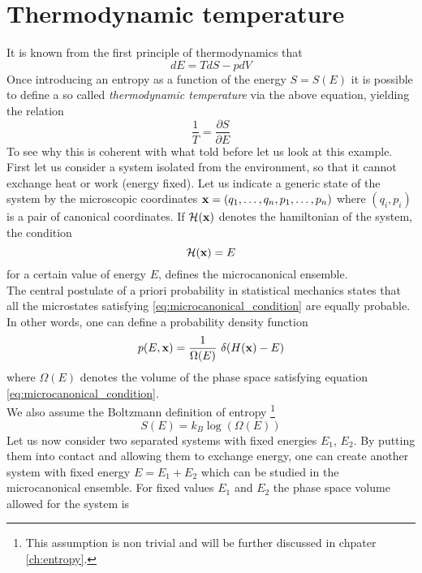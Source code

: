 \section{Thermodynamic temperature}
It is known from the first principle of thermodynamics that 
\begin{equation*}
    dE = TdS - pdV
\end{equation*}
Once introducing an entropy as a function of the energy $S = S(E)$ it is possible to define a so called \emph{thermodynamic temperature} via the above equation, yielding the relation $$\frac{1}{T} = \frac{\partial S}{\partial E}$$
To see why this is coherent with what told before let us look at this example. \\
First let us consider a system isolated from the environment, so that it cannot exchange heat or work (energy fixed). Let us indicate a generic
state of the system by the microscopic coordinates $\mathbf{x} = (q_1, \dots, q_n, p_1, \dots, p_n)$ where $(q_i, p_i)$ is a pair of canonical coordinates. If $\mathcal{H}(\mathbf{x})$ denotes the hamiltonian of the system,
the condition
\begin{equation}
    \mathcal{H}(\mathbf{x}) = E
    \label{eq:microcanonical_condition}
\end{equation}    
for a certain value of energy $E$, defines the microcanonical ensemble. \\
The central postulate of a priori probability in statistical mechanics states that all the microstates satisfying \ref{eq:microcanonical_condition} are equally probable. In other words, one can
define a probability density function
\begin{equation*}
    p(E, \mathbf{x}) = \frac{1}{\Omega(E)} \ \delta(H(\mathbf{x}) - E)
\end{equation*}
where $\Omega(E)$ denotes the volume of the phase space satisfying equation \ref{eq:microcanonical_condition}. \\
We also assume the Boltzmann definition of entropy \footnote{This assumption is non trivial and will be further discussed in chpater \ref{ch:entropy}.}
\begin{equation}
    S(E) = k_B \log(\Omega(E))
    \label{eq:Boltzmann_entropy}
\end{equation}
Let us now consider two separated systems with fixed energies $E_1$, $E_2$. By putting them into contact and allowing them to exchange energy, one can create another system 
with fixed energy $E = E_1 + E_2$ which can be studied in the microcanonical ensemble.
For fixed values $E_1$ and $E_2$ the phase space volume allowed for the system is 
